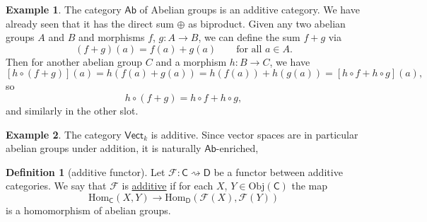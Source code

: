 \documentclass[a4paper]{report}
\newcommand{\defn}[1]{\ul{#1}}
\newcommand{\Obj}{\mathrm{Obj}}
\newcommand{\Hom}{\mathrm{Hom}}
\theoremstyle{definition}
\newtheorem{definition}{Definition}[section]
\newtheorem{example}{Example}[section]
\theoremstyle{plain}
\theoremstyle{remark}
\begin{document}
\begin{example}
  The category $\mathsf{Ab}$ of Abelian groups is an additive category. We have already seen that it has the direct sum $\oplus$ as biproduct. Given any two abelian groups $A$ and $B$ and morphisms $f$, $g\colon A \to B$, we can define the sum $f + g$ via
  \begin{equation*}
    (f + g)(a) = f(a) + g(a)\qquad\text{for all }a \in A.
  \end{equation*}
  Then for another abelian group $C$ and a morphism $h\colon B \to C$, we have
  \begin{equation*}
    \left[ h \circ (f+g) \right](a) = h(f(a) + g(a)) = h(f(a)) + h(g(a)) = \left[ h \circ f + h \circ g \right](a),
  \end{equation*}
  so 
  \begin{equation*}
    h \circ (f+g) =h \circ f + h \circ g,
  \end{equation*}
  and similarly in the other slot.
\end{example}

\begin{example}
  The category $\mathsf{Vect}_{k}$ is additive. Since vector spaces are in particular abelian groups under addition, it is naturally $\mathsf{Ab}$-enriched,
\end{example}

\begin{definition}[additive functor]
  \label{def:additivefunctor}
  Let $\mathcal{F}\colon \mathsf{C} \rightsquigarrow \mathsf{D}$ be a functor between additive categories. We say that $\mathcal{F}$ is \defn{additive} if for each $X$, $Y \in \Obj(\mathsf{C})$ the map
  \begin{equation*}
    \Hom_{\mathsf{C}}(X, Y) \to \Hom_{\mathsf{D}}(\mathcal{F}(X), \mathcal{F}(Y))
  \end{equation*}
  is a homomorphism of abelian groups.
\end{definition}
\end{document}
